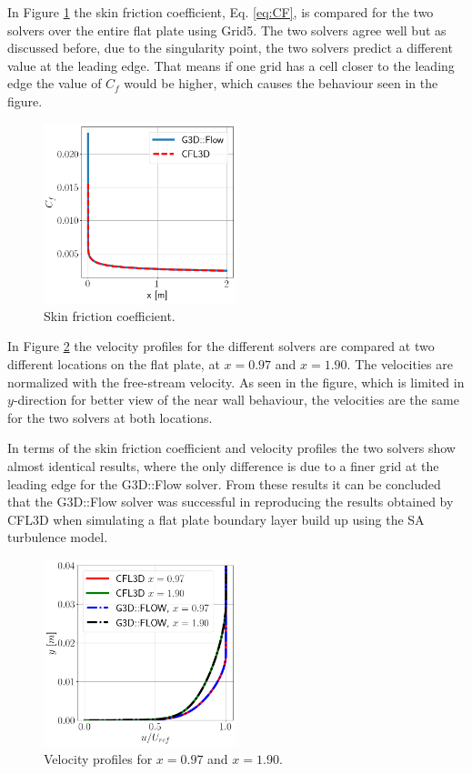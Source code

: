 In Figure \ref{fig:FPCF} the skin friction coefficient, Eq. \ref{eq:CF}, is compared for the two solvers over the entire flat plate using Grid5. The two solvers agree well but as discussed before, due to the singularity point, the two solvers predict a different value at the leading edge. That means if one grid has a cell closer to the leading edge the value of $C_f$ would be higher, which causes the behaviour seen in the figure.
\begin{figure}[H]
  \centering
  \includegraphics[width=0.5\textwidth]{figures/FPCF.png}
  \caption{Skin friction coefficient.} \label{fig:FPCF}
\end{figure}

In Figure \ref{fig:FPvel} the velocity profiles for the different solvers are compared at two different locations on the flat plate, at $x=0.97$ and $x=1.90$. The velocities are normalized with the free-stream velocity. As seen in the figure, which is limited in $y$-direction for better view of the near wall behaviour, the velocities are the same for the two solvers at both locations. 

In terms of the skin friction coefficient and velocity profiles the two solvers show almost identical results, where the only difference is due to a finer grid at the leading edge for the G3D::Flow solver. From these results it can be concluded that the G3D::Flow solver was successful in reproducing the results obtained by CFL3D when simulating a flat plate boundary layer build up using the SA turbulence model.
\begin{figure}[H]
  \centering
  \includegraphics[width=0.5\textwidth]{figures/FPVelComp.png}
  \caption{Velocity profiles for $x=0.97$ and $x=1.90$.} \label{fig:FPvel}
\end{figure}

